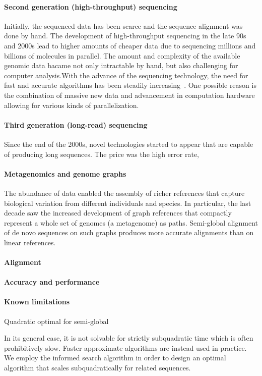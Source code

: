 \paragraph{Second generation (high-throughput) sequencing}
Initially, the sequenced data has been scarce and the sequence alignment was
done by hand. The development of high-throughput sequencing in the late 90s and
2000s lead to higher amounts of cheaper data due to sequencing millions and
billions of molecules in parallel. The amount and complexity of the available
genomic data bacame not only intractable by hand, but also challenging for
computer analysis.With the advance of the sequencing technology, the need for
fast and accurate algorithms has been steadily
increasing~\cite{alser2021technology}. One possible reason is the combination of
massive new data and advancement in computation hardware allowing for various
kinds of parallelization.

\paragraph{Third generation (long-read) sequencing}
Since the end of the 2000s, novel technologies started to appear that are
capable of producing long sequences. The price was the high error rate, 

\paragraph{Metagenomics and genome graphs}
The abundance of data enabled the assembly of richer references that capture
biological variation from different individuals and species. In particular, the
last decade saw the increased development of graph references that compactly
represent a whole set of genomes (a metagenome) as paths. Semi-global alignment
of de novo sequences on such graphs produces more accurate alignments than on
linear references.

\paragraph{Alignment}

\paragraph{Accuracy and performance}

\paragraph{Known limitations}

Quadratic optimal for semi-global

In its general case, it is not solvable for strictly subquadratic time which is
often prohibitively slow. Faster approximate algorithms are instead used in
practice. We employ the \A informed search algorithm in order to design an
optimal algorithm that scales subquadratically for related sequences.
